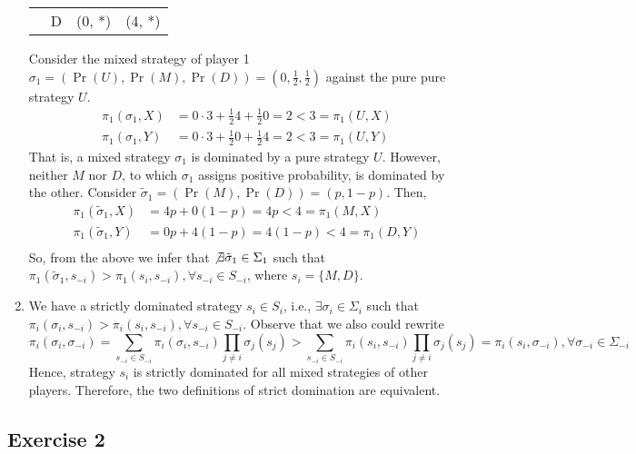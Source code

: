 \documentclass[]{article}
\begin{document}
\begin{enumerate}
\begin{table}[H]
\begin{tabular}{ll|ll}
			& D & (0, *) & (4, *)           
		\end{tabular}
	\end{table}
	Consider the mixed strategy of player 1 $\sigma_1 = (\Pr(U), \Pr(M), \Pr(D)) = (0, \frac{1}{2}, \frac{1}{2})$ against the pure pure strategy $U$.
	\begin{equation}
		\begin{split}
		\pi_1(\sigma_1, X)& = 0\cdot3 + \frac{1}{2}4 + \frac{1}{2}0 = 2 < 3 = \pi_1(U, X) \\ \nonumber
		\pi_1(\sigma_1, Y)& = 0\cdot3 + \frac{1}{2}0 + \frac{1}{2}4 = 2 < 3 = \pi_1(U, Y)
		\end{split}
	\end{equation}
	That is, a mixed strategy $\sigma_1$ is dominated by a pure strategy $U$. However, neither $M$ nor $D$, to which $\sigma_1$ assigns positive probability, is dominated by the other. Consider $\tilde{\sigma}_1 = (\Pr(M), \Pr(D)) = (p, 1-p)$. Then,
	\begin{equation}
		\begin{split}
		\pi_1(\tilde{\sigma}_1, X)& = 4p + 0(1-p) = 4p < 4 = \pi_1(M, X) \\ \nonumber
		\pi_1(\tilde{\sigma}_1, Y)& = 0p + 4(1-p) = 4(1-p) < 4 = \pi_1(D, Y) \\
		\end{split}
	\end{equation}
	So, from the above we infer that $\not\exists\tilde{\sigma}_1\in\Sigma_1$ such that $\pi_1(\tilde{\sigma}_1, s_{-i}) > \pi_1(s_i, s_{-i}), \forall s_{-i}\in S_{-i}$, where $s_i = \{M, D\}$.
	
	\item We have a strictly dominated strategy $s_i\in S_i$, i.e., $\exists\sigma_i\in\Sigma_i$ such that $\pi_i(\sigma_i, s_{-i}) > \pi_i(s_i, s_{-i}), \forall s_{-i}\in S_{-i}$. Observe that we also could rewrite
	\begin{equation}
		\pi_i(\sigma_i, \sigma_{-i}) = \sum\limits_{s_{-i}\in S_{-i}}\pi_i(\sigma_i, s_{-i})\prod\limits_{j\neq i}\sigma_j(s_j) > \sum\limits_{s_{-i}\in S_{-i}}\pi_i(s_i, s_{-i})\prod\limits_{j\neq i}\sigma_j(s_j) = \pi_i(s_i, \sigma_{-i}), \forall \sigma_{-i}\in\Sigma_{-i} \nonumber
	\end{equation}
	Hence, strategy $s_i$ is strictly dominated for all mixed strategies of other players. Therefore, the two definitions of strict domination are equivalent.
\end{enumerate}

\subsection*{Exercise 2}
\end{document}

